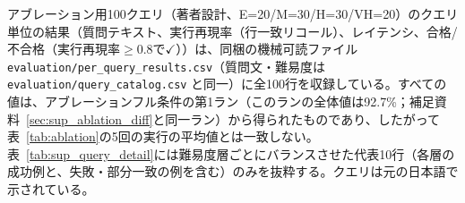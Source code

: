 \documentclass[twocolumn]{interact}
\makeatletter
\def\toprule{\noalign{\ifnum0=`}\fi
  \@aboverulesep=\abovetopsep
  \global\@belowrulesep=\belowrulesep
  \global\@thisruleclass=\@ne
  \@ifnextchar[{\@BTrule}{\@BTrule[\heavyrulewidth]}}
\def\midrule{\noalign{\ifnum0=`}\fi
  \@aboverulesep=\aboverulesep
  \global\@belowrulesep=\belowrulesep
  \global\@thisruleclass=\@ne
  \@ifnextchar[{\@BTrule}{\@BTrule[\lightrulewidth]}}
\makeatother
\begin{document}
アブレーション用100クエリ（著者設計、E=20/M=30/H=30/VH=20）のクエリ単位の結果（質問テキスト、実行再現率（行一致リコール）、レイテンシ、合格/不合格（実行再現率$\geq 0.8$で$\checkmark$））は、同梱の機械可読ファイル \texttt{evaluation/per\_query\_results.csv}（質問文・難易度は \texttt{evaluation/query\_catalog.csv} と同一）に全100行を収録している。すべての値は、アブレーションフル条件の第1ラン（このランの全体値は92.7\%；補足資料~\ref{sec:sup_ablation_diff}と同一ラン）から得られたものであり、したがって表~\ref{tab:ablation}の5回の実行の平均値とは一致しない。表~\ref{tab:sup_query_detail}には難易度層ごとにバランスさせた代表10行（各層の成功例と、失敗・部分一致の例を含む）のみを抜粋する。クエリは元の日本語で示されている。
\begin{table}[htbp]
\centering
\caption{100の評価クエリに関する詳細結果の抜粋（10行；アブレーションfull条件の第1ラン。全100行は \texttt{evaluation/per\_query\_results.csv}）。P/F: 実行再現率$\geq 0.8$で$\checkmark$。}
\label{tab:sup_query_detail}
\footnotesize
{}
\end{table}
\end{document}
